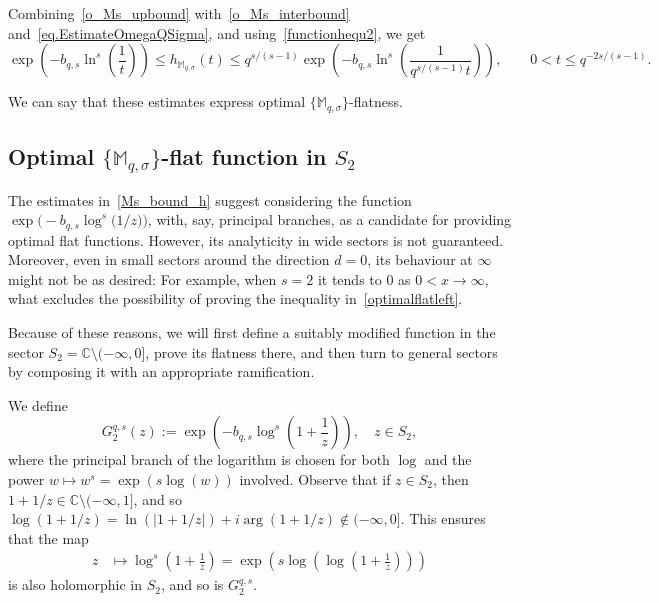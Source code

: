 \documentclass[11pt,a4paper]{article}
\theoremstyle{plain}
\theoremstyle{definition}
\newcommand{\C}{\mathbb{C}}
\def\Ms{{\mathbb{M}}_{q,\sigma}}
\begin{document}
Combining~\eqref{o_Ms_upbound} with~\eqref{o_Ms_interbound} and~\eqref{eq.EstimateOmegaQSigma}, and using~\eqref{functionhequ2}, we get
\begin{equation}\label{Ms_bound_h}
\exp\left(-b_{q,s}\ln^s\left(\frac{1}{t}\right)\right)	\leq h_{\Ms}(t) \leq q^{s/(s-1)}\exp\left(-b_{q,s}\ln^s\left(\frac{1}{q^{s/(s-1)}t}\right)\right), \qquad 0<t\leq q^{-2s/(s-1)}.
\end{equation}

We can say that these estimates express optimal $\{\Ms\}$-flatness.


\subsection{Optimal $\{\Ms\}$-flat function in $S_2$}

The estimates in~\eqref{Ms_bound_h} suggest considering the function $\exp\big(-b_{q,s}\log^s\big(1/z\big)\big)$, with, say, principal branches, as a candidate for providing optimal flat functions. However, its analyticity in wide sectors is not guaranteed. Moreover, even in small sectors around the direction $d=0$, its behaviour at $\infty$ might not be as desired: For example, when $s=2$ it tends to 0 as $0<x\to\infty$, what excludes the possibility of proving the
inequality in~\eqref{optimalflatleft}.

Because of these reasons, we will first define a suitably modified function in the sector $S_2=\C\setminus(-\infty,0]$, prove its flatness there, and then turn to general sectors by composing it with an appropriate ramification.

We define
\begin{equation}\label{eq.defG2}
G_2^{q,s}(z):=\exp\left(-b_{q,s}\log^s\left(1+\frac{1}{z}\right)\right),\quad z\in S_2,
\end{equation}
where the principal branch of the logarithm is chosen for both $\log$ and the power $w\mapsto w^s=\exp(s\log(w))$ involved.
Observe that if $z\in S_2$, then $1+1/z \in\mathbb{C}\setminus(-\infty,1]$, and so
$\log(1+1/z)=\ln(|1+1/z|)+i\arg(1+1/z)\notin(-\infty,0]$. This ensures that the map
\begin{align*}
z&\mapsto \log^{s}\left(1+\frac{1}{z}\right)= \exp\left(s\log\left(\log(1+\frac{1}{z})\right)\right)
\end{align*}
is also holomorphic in $S_2$, and so is $G_2^{q,s}$.
\end{document}
